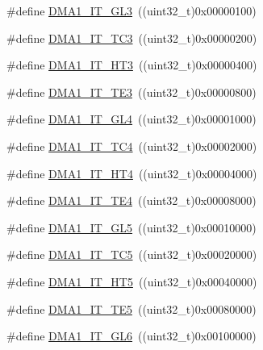 \begin{DoxyCompactItemize}
\item 
\#define \hyperlink{group___d_m_a__interrupts__definition_ga3e71e661eb2ebab146b48b3aee5ad9b1}{D\+M\+A1\+\_\+\+I\+T\+\_\+\+G\+L3}~((uint32\+\_\+t)0x00000100)
\item 
\#define \hyperlink{group___d_m_a__interrupts__definition_ga37c375d4e3d681efecddc9f25c0c7bcd}{D\+M\+A1\+\_\+\+I\+T\+\_\+\+T\+C3}~((uint32\+\_\+t)0x00000200)
\item 
\#define \hyperlink{group___d_m_a__interrupts__definition_ga1e3b12ceb8ba5b8d129d5bdee21904de}{D\+M\+A1\+\_\+\+I\+T\+\_\+\+H\+T3}~((uint32\+\_\+t)0x00000400)
\item 
\#define \hyperlink{group___d_m_a__interrupts__definition_ga54e8f93512a446fcaf2b10cd92f81379}{D\+M\+A1\+\_\+\+I\+T\+\_\+\+T\+E3}~((uint32\+\_\+t)0x00000800)
\item 
\#define \hyperlink{group___d_m_a__interrupts__definition_ga24d5f98faba722d1ab54812ee7ad8eea}{D\+M\+A1\+\_\+\+I\+T\+\_\+\+G\+L4}~((uint32\+\_\+t)0x00001000)
\item 
\#define \hyperlink{group___d_m_a__interrupts__definition_ga4f6dd1c5092ca262f38c8bb8a7dc2986}{D\+M\+A1\+\_\+\+I\+T\+\_\+\+T\+C4}~((uint32\+\_\+t)0x00002000)
\item 
\#define \hyperlink{group___d_m_a__interrupts__definition_ga1e74c117ead07f4a8749e076316cf9d0}{D\+M\+A1\+\_\+\+I\+T\+\_\+\+H\+T4}~((uint32\+\_\+t)0x00004000)
\item 
\#define \hyperlink{group___d_m_a__interrupts__definition_ga48c3fecb70662a786f32d5cea0a894f8}{D\+M\+A1\+\_\+\+I\+T\+\_\+\+T\+E4}~((uint32\+\_\+t)0x00008000)
\item 
\#define \hyperlink{group___d_m_a__interrupts__definition_ga6a8d925c490ea6e7eaf9fbceea9774f6}{D\+M\+A1\+\_\+\+I\+T\+\_\+\+G\+L5}~((uint32\+\_\+t)0x00010000)
\item 
\#define \hyperlink{group___d_m_a__interrupts__definition_gaf916fe8154ad4a956eec66ecfe0e7e36}{D\+M\+A1\+\_\+\+I\+T\+\_\+\+T\+C5}~((uint32\+\_\+t)0x00020000)
\item 
\#define \hyperlink{group___d_m_a__interrupts__definition_ga3ddcb696d05b414be7a533993efa849f}{D\+M\+A1\+\_\+\+I\+T\+\_\+\+H\+T5}~((uint32\+\_\+t)0x00040000)
\item 
\#define \hyperlink{group___d_m_a__interrupts__definition_ga7c1f1a465bd0e9755e5fbf2cd7054528}{D\+M\+A1\+\_\+\+I\+T\+\_\+\+T\+E5}~((uint32\+\_\+t)0x00080000)
\item 
\#define \hyperlink{group___d_m_a__interrupts__definition_ga623e986da940dbdbc4155f0c1fc4eae8}{D\+M\+A1\+\_\+\+I\+T\+\_\+\+G\+L6}~((uint32\+\_\+t)0x00100000)

\end{DoxyCompactItemize}

